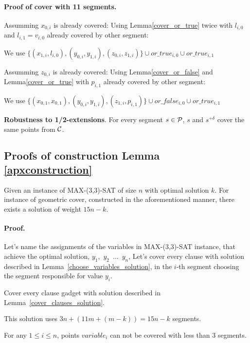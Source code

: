 \paragraph{Proof of cover with 11 segments.}
Assumming $x_{0, i}$ is already covered:
Using Lemma\ref{cover_or_true} twice with $l_{i, 0}$  and $l_{i, 1} = v_{i, 0}$ already covered by other segment:

We use 
$\{ (x_{1, i}, l_{i, 0}), (y_{0, i}, y_{1, i}),
(z_{0, i}, z_{1, i}) \} \cup or\_true_{i, 0} \cup or\_true_{i, 1}$

Assumming $z_{0, i}$ is already covered:
Using Lemma\ref{cover_or_false} and Lemma\ref{cover_or_true} with $p_{i, 1}$ already covered by other segment:

We use 
$\{ (x_{0, 1}, x_{0, 1}), (y_{0, i}, y_{1, i}),
(z_{1, i}, p_{i, 1}) \} \cup or\_false_{i, 0} \cup or\_true_{i, 1}$


\begin{lemma}
\textbf{Robustness to 1/2-extensions}. For every segment $s \in \mathcal{P}$,
$s$ and $s^{+\delta}$ cover the same points from $\mathcal{C}$.
\end{lemma}

\subsection{Proofs of construction Lemma \ref{apxconstruction}}
\begin{lemma}
	\label{construction_correctness}
	Given an instance of MAX-(3,3)-SAT of size $n$
	with optimal solution $k$.
	For instance of geometric cover, constructed
	in the aforementioned manner, 
	there exists a solution of weight $15n - k$.
\end{lemma}
\paragraph{Proof.}
Let's name the assignments of the variables in MAX-(3,3)-SAT instance,
that achieve the optimal solution,
$y_1$,~$y_2$~$\ldots$~$y_n$,
Let's cover every clause with solution described in
Lemma~\ref{choose_variables_solution},
in the $i$-th segment choosing the segment responsible for value $y_i$.

Cover every clause gadget with solution described in
Lemma~\ref{cover_clauses_solution}.

This solution uses $3n + (11m + (m-k)) = 15n - k$ segments.


\begin{lemma}
\label{choose_variables_no_less}
For any $1 \le i \le n$, points $variable_i$
can not be covered with less than 3 segments.
\end{lemma}

